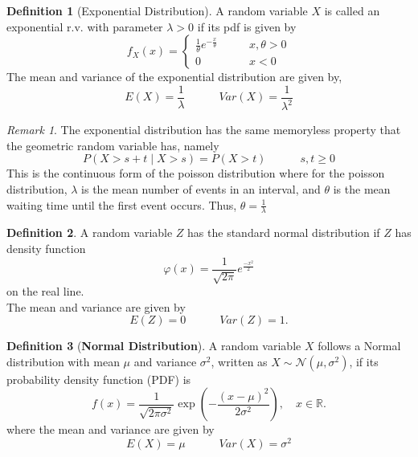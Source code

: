 \documentclass{article}
\theoremstyle{definition}
\newtheorem{definition}{Definition}[section]
\theoremstyle{remark}
\newtheorem{remark}{Remark}[section]
\begin{document}
\vspace{.5cm}

\begin{definition}[Exponential Distribution]
A random variable $X$ is called an exponential r.v. with parameter $\lambda > 0$ if its pdf is given by
\[
f_X(x) = \begin{cases}
\frac{1}{\theta} e^{- \frac{x}{\theta}} \quad \quad &x, \theta > 0 \\
0 & x < 0
\end{cases}
\]
The mean and variance of the exponential distribution are given by, 
\[
E(X) = \frac{1}{\lambda} \quad \quad \quad Var(X) = \frac{1}{\lambda ^2}
\]

\end{definition}

\begin{remark}
The exponential distribution has the same memoryless property that the 
geometric random variable has, namely
\[
P(X > s+t \mid X > s) = P(X > t) \quad \quad \quad s,t \geq 0
\]
This is the continuous form of the poisson distribution where for the  
poisson distribution, $\lambda$ is the mean number of events in an interval, 
and $\theta$ is the mean waiting time until the first event occurs. Thus, $\theta = \frac{1}{\lambda}$
\end{remark}










\vspace{.5cm}



\begin{definition}
A random variable $Z$ has the standard normal distribution if $Z$ has 
density function
\[
\varphi  (x) = \frac{1}{\sqrt{2 \pi}} e^{\frac{-x^2}{2}}
\]
on the real line.\\ 
The mean and variance are given by \[
E(Z) = 0 \quad \quad \quad Var(Z) = 1.
\]
\end{definition}


\vspace{.5cm}










\begin{definition}[\textbf{Normal Distribution}]
A random variable \( X \) follows a Normal distribution with mean \( \mu \) and variance \( \sigma^2 \), written as \( X \sim \mathcal{N}(\mu, \sigma^2) \), if its probability density function (PDF) is
\[
f(x) = \frac{1}{\sqrt{2\pi\sigma^2}} \exp \left( -\frac{(x - \mu)^2}{2\sigma^2} \right), \quad x \in \mathbb{R}.
\]
where the mean and variance are given by
\[
E(X) = \mu \quad \quad \quad Var(X) = \sigma ^2
\]
\end{definition}
\end{document}
